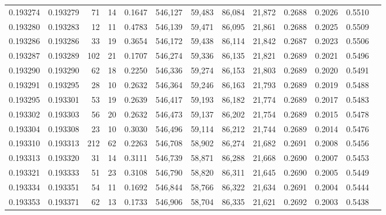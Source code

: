 \begin{tabular}{rrrrrrrrrrrrr}
0.193274 & 0.193279 &    71 &  14 &                                     0.1647 & 546,127 &  59,483 &  86,084 &  21,872 & 0.2688 & 0.2026 & 0.5510 \\
0.193280 & 0.193283 &    12 &  11 &                                     0.4783 & 546,139 &  59,471 &  86,095 &  21,861 & 0.2688 & 0.2025 & 0.5509 \\
0.193286 & 0.193286 &    33 &  19 &                                     0.3654 & 546,172 &  59,438 &  86,114 &  21,842 & 0.2687 & 0.2023 & 0.5506 \\
0.193287 & 0.193289 &   102 &  21 &                                     0.1707 & 546,274 &  59,336 &  86,135 &  21,821 & 0.2689 & 0.2021 & 0.5496 \\
0.193290 & 0.193290 &    62 &  18 &                                     0.2250 & 546,336 &  59,274 &  86,153 &  21,803 & 0.2689 & 0.2020 & 0.5491 \\
0.193291 & 0.193295 &    28 &  10 &                                     0.2632 & 546,364 &  59,246 &  86,163 &  21,793 & 0.2689 & 0.2019 & 0.5488 \\
0.193295 & 0.193301 &    53 &  19 &                                     0.2639 & 546,417 &  59,193 &  86,182 &  21,774 & 0.2689 & 0.2017 & 0.5483 \\
0.193302 & 0.193303 &    56 &  20 &                                     0.2632 & 546,473 &  59,137 &  86,202 &  21,754 & 0.2689 & 0.2015 & 0.5478 \\
0.193304 & 0.193308 &    23 &  10 &                                     0.3030 & 546,496 &  59,114 &  86,212 &  21,744 & 0.2689 & 0.2014 & 0.5476 \\
0.193310 & 0.193313 &   212 &  62 &                                     0.2263 & 546,708 &  58,902 &  86,274 &  21,682 & 0.2691 & 0.2008 & 0.5456 \\
0.193313 & 0.193320 &    31 &  14 &                                     0.3111 & 546,739 &  58,871 &  86,288 &  21,668 & 0.2690 & 0.2007 & 0.5453 \\
0.193321 & 0.193333 &    51 &  23 &                                     0.3108 & 546,790 &  58,820 &  86,311 &  21,645 & 0.2690 & 0.2005 & 0.5449 \\
0.193334 & 0.193351 &    54 &  11 &                                     0.1692 & 546,844 &  58,766 &  86,322 &  21,634 & 0.2691 & 0.2004 & 0.5444 \\
0.193353 & 0.193371 &    62 &  13 &                                     0.1733 & 546,906 &  58,704 &  86,335 &  21,621 & 0.2692 & 0.2003 & 0.5438 \\

\end{tabular}
